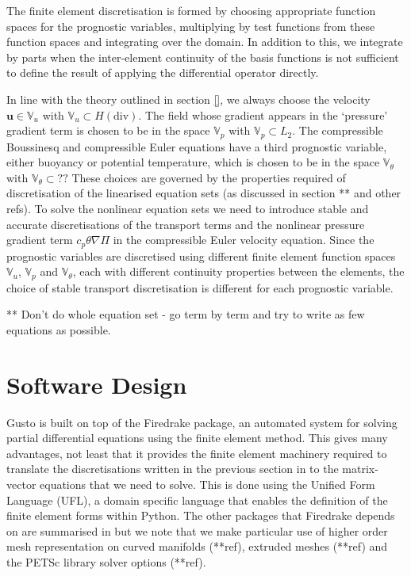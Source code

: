 \documentclass[journal abbreviation, manuscript]{copernicus}
\def\MM#1{\boldsymbol{#1}}
\begin{document}
The finite element discretisation is formed by choosing appropriate
function spaces for the prognostic variables, multiplying by test
functions from these function spaces and integrating over the
domain. In addition to this, we integrate by parts when the
inter-element continuity of the basis functions is not sufficient to
define the result of applying the differential operator directly.

In line with the theory outlined in section \ref{}, we always choose
the velocity $\MM{u} \in \mathbb{V}_u$ with $\mathbb{V}_u \subset
H(\text{div})$. The field whose gradient appears in the `pressure'
gradient term is chosen to be in the space $\mathbb{V}_p$ with
$\mathbb{V}_p \subset L_2$. The compressible Boussinesq and
compressible Euler equations have a third prognostic variable, either
buoyancy or potential temperature, which is chosen to be in the space
$\mathbb{V}_\theta$ with $\mathbb{V}_\theta \subset ??$ These choices
are governed by the properties required of discretisation of the
linearised equation sets (as discussed in section ** and other
refs). To solve the nonlinear equation sets we need to introduce
stable and accurate discretisations of the transport terms and the
nonlinear pressure gradient term $c_p\theta\nabla \Pi$ in the
compressible Euler velocity equation. Since the prognostic variables
are discretised using different finite element function spaces
$\mathbb{V}_u$, $\mathbb{V}_p$ and $\mathbb{V}_\theta$, each with
different continuity properties between the elements, the choice of
stable transport discretisation is different for each prognostic
variable.




** Don't do whole equation set - go term by term and try to write as
few equations as possible.


\section{Software Design}
\label{sec: design}
Gusto is built on top of the Firedrake package, an automated system
for solving partial differential equations using the finite element
method. This gives many advantages, not least that it provides the
finite element machinery required to translate the discretisations
written in the previous section in to the matrix-vector equations that
we need to solve. This is done using the Unified Form Language (UFL),
a domain specific language that enables the definition of the finite
element forms within Python. The other packages that Firedrake depends
on are summarised in \citet{davies2022towards} but we note that we
make particular use of higher order mesh representation on curved
manifolds (**ref), extruded meshes (**ref) and the PETSc library
solver options (**ref).
\end{document}
